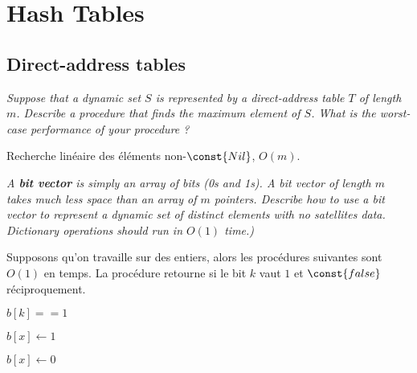 \section{Hash Tables}

\subsection{Direct-address tables}
\label{sub:direct_address_tables}

\begin{description}

 \textit{Suppose that a dynamic set $S$ is represented by a direct-address table $T$ of length $m$. Describe a procedure that finds the maximum element of $S$. What is the worst-case performance of your procedure ?}

\begin{ex}
  Recherche linéaire des éléments non-$\const{Nil}$, $O(m)$.
\end{ex}

 \textit{A \textbf{bit vector} is simply an array of bits (0s and 1s). A bit vector of length $m$ takes much less space than an array of $m$ pointers. Describe how to use a bit vector to represent a dynamic set of distinct elements with no satellites data. Dictionary operations should run in $O(1)$ time.)}

\begin{ex}

Supposons qu'on travaille sur des entiers, alors les procédures suivantes sont $O(1)$ en temps. La procédure  retourne  si le bit $k$ vaut $1$ et $\const{false}$ réciproquement.

\begin{codebox}
   \li \Return $b[k] == 1$
\end{codebox}
\begin{codebox}
   \li \Return $b[x] \gets 1$
\end{codebox}
\begin{codebox}
   \li \Return $b[x] \gets 0$
\end{codebox}
\end{ex}

 \textit{}

 \textit{}


\end{description}


